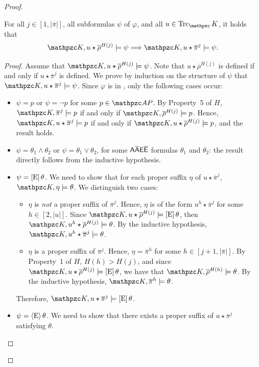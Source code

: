 \begin{proof}
\begin{claim}  For all $j\in [1,|\overline{\pi}|]$, all subformulas $\psi$ of $\varphi$, and all $u\in\Trk_\Ku$, it holds that 
\[
\Ku,u\star \overline{\rho}^{H(j)}\models \psi \Longrightarrow \Ku,u\star\overline{\pi}^{j}\models \psi.
\]
\end{claim}
\begin{proof}
Assume that $\Ku,u\star\overline{\rho}^{H(j)}\models \psi $. Note that $u\star \overline{\rho}^{H(j)}$ is defined if and only if $u\star \overline{\pi}^{j}$ is defined. We prove by induction on the structure of $\psi$  that
$\Ku,u\star\overline{\pi}^{j}\models \psi$. Since $\varphi$ is in \nnf, only the following cases occur:
 \begin{itemize}
   \item $\psi= p$ or $\psi=\neg p$ for some $p\in \Prop$. By Property~5 of $H$, $\Ku, \overline{\pi}^{j}\models p$ if and only if $\Ku,\overline{\rho}^{H(j)}\models p$.
    Hence, $\Ku, u\star \overline{\pi}^{j}\models p$ if and only if $\Ku,u\star\overline{\rho}^{H(j)}\models p$, and the result holds.
    \item $\psi= \theta_1\wedge\theta_2$ or $\psi= \theta_1\vee\theta_2$, for some $\mathsf{A\overline{A}E\overline{E}}$ formulas $\theta_1$ and $\theta_2$: the result directly follows from the inductive hypothesis.
   \item $\psi = \operatorname{\mathopen[ E \mathclose]}\theta$. We need to show that for each proper suffix $\eta$ of $u\star\overline{\pi}^{j}$, $\Ku,\eta\models\theta$. We distinguish two cases:
 \begin{itemize}
   \item $\eta$ is \emph{not} a proper suffix of $\overline{\pi}^{j}$. Hence, $\eta$ is of the form $u^{h}\star \overline{\pi}^{j}$ for some $h\in [2,|u|]$. Since $\Ku,u\star\overline{\rho}^{H(j)}\models \hsEu\theta $, then
   $\Ku,u^{h}\star\overline{\rho}^{H(j)}\models \theta $.  By the inductive hypothesis, $\Ku,u^{h}\star\overline{\pi}^j\models \theta $.
   \item $\eta$ is a proper suffix of $\overline{\pi}^{j}$. Hence, $\eta = \overline{\pi}^{h}$ for some $h\in [j+1,|\overline{\pi}|]$.   By Property~1 of $H$, $H(h)>H(j)$, and since $\Ku,u\star\overline{\rho}^{H(j)}\models \hsEu\theta $, we have that $\Ku,\overline{\rho}^{H(h)}\models \theta $. By the inductive hypothesis,  $\Ku,\overline{\pi}^h\models \theta $.
 \end{itemize}
 Therefore, $\Ku,u\star \overline{\pi}^j\models \hsEu\theta $.
\item $\psi = \operatorname{\langle E\rangle}\theta$. We need to show that there exists a proper suffix of $u\star\overline{\pi}^{j}$ satisfying $\theta$. %

\end{itemize}
\end{proof}
\end{proof}
